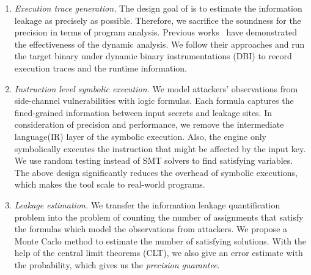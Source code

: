 \begin{enumerate}
    \item \emph{Execution trace generation.} The design goal of \tool{} is to
          estimate the information leakage as precisely as possible. Therefore,
          we sacrifice the soundness for the precision in terms of program
          analysis. Previous works~\cite{203878,217537} have demonstrated the
          effectiveness of the dynamic analysis. We follow their approaches and
          run the target binary under dynamic binary instrumentations (DBI) to
          record execution traces and the runtime information.
    \item \emph{Instruction level symbolic execution.} We model attackers'
          observations from side-channel vulnerabilities with logic formulas.
          Each formula captures the fined-grained information between input
          secrets and leakage sites. In consideration of precision and
          performance, we remove the intermediate language(IR) layer of the
          symbolic execution. Also, the engine only symbolically executes the
          instruction that might be affected by the input key. We use random
          testing instead of SMT solvers to find satisfying variables. The above
          design significantly reduces the overhead of symbolic executions,
          which makes the tool scale to real-world programs.
    \item \emph{Leakage estimation.} We transfer the information leakage quantification
          problem into the problem of counting the number of assignments that satisfy the
          formulas which model the observations from attackers. We propose a
          Monte Carlo method to estimate the number of satisfying solutions.
          With the help of the central
          limit theorems (CLT), we also give an error estimate with the probability,
          which gives us the \emph{precision guarantee}.

\end{enumerate}



